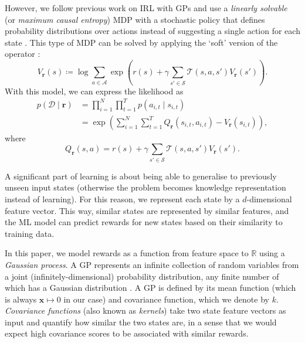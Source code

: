 \documentclass{mpaper}
\newcommand{\V}{V_{\mathbf{r}}}
\begin{document}
However, we follow previous work on IRL with GPs
\cite{DBLP:conf/uai/JinDAS17,DBLP:conf/nips/LevinePK11} and use a
\emph{linearly solvable} (or \emph{maximum causal entropy}) MDP with a
stochastic policy that defines probability distributions over actions instead
of suggesting a single action for each state \cite{ziebart2008maximum}. This
type of MDP can be solved by applying the `soft' version of the operator
\cite{DBLP:conf/nips/LevinePK11,supplementary_material}:
\begin{equation} \label{eq:update_rule}
  \V(s) \coloneqq \log \sum_{a \in \mathcal{A}} \exp\left( r(s) + \gamma\sum_{s'
      \in \mathcal{S}} \mathcal{T}(s, a, s')\V(s') \right).
\end{equation}
With this model, we can express the likelihood as
\cite{DBLP:conf/uai/JinDAS17,DBLP:conf/nips/LevinePK11}
\begin{align*}
  p(\mathcal{D} \mid \mathbf{r}) &= \prod_{i=1}^N \prod_{t=1}^T p(a_{i,t} \mid s_{i,t}) \\
                                 &= \exp\left( \sum_{i=1}^N \sum_{t=1}^T Q_{\mathbf{r}}(s_{i,t}, a_{i,t}) - \V(s_{i,t}) \right),
\end{align*}
where
\[
  Q_{\mathbf{r}}(s, a) = r(s) + \gamma\sum_{s' \in \mathcal{S}}
  \mathcal{T}(s, a, s')\V(s').
\]

A significant part of learning is about being able to generalise to previously
unseen input states (otherwise the problem becomes knowledge representation
instead of learning). For this reason, we represent each state by a
$d$-dimensional feature vector. This way, similar states are represented by
similar features, and the ML model can predict rewards for new states based on
their similarity to training data.

In this paper, we model rewards as a function from feature space to
$\mathbb{R}$ using a \emph{Gaussian process}. A GP represents an infinite
collection of random variables from a joint (infinitely-dimensional) probability
distribution, any finite number of which has a Gaussian distribution
\cite{DBLP:books/lib/RasmussenW06}. A GP is defined by its mean function (which
is always $\mathbf{x} \mapsto 0$ in our case) and covariance function, which we
denote by $k$. \emph{Covariance functions} (also known as \emph{kernels}) take
two state feature vectors as input and quantify how similar the two states are,
in a sense that we would expect high covariance scores to be associated with
similar rewards.
\end{document}
